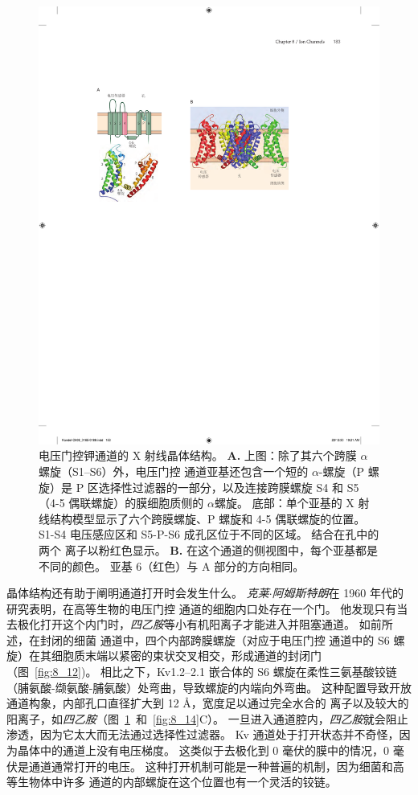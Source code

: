 \begin{figure}[htbp]
	\centering
	\includegraphics[width=0.9\linewidth]{chap08/fig_8_13}
	\caption{电压门控钾通道的 X 射线晶体结构\cite{long2007atomic}。
		\textbf{A.} 上图：除了其六个跨膜 $\alpha$ 螺旋（S1–S6）外，电压门控  通道亚基还包含一个短的 $\alpha$-螺旋（P 螺旋）是 P 区选择性过滤器的一部分，以及连接跨膜螺旋 S4 和 S5（4-5 偶联螺旋）的膜细胞质侧的 $\alpha$螺旋。
		底部：单个亚基的 X 射线结构模型显示了六个跨膜螺旋、P 螺旋和 4-5 偶联螺旋的位置。
		S1-S4 电压感应区和 S5-P-S6 成孔区位于不同的区域。
		结合在孔中的两个  离子以粉红色显示。
		\textbf{B.} 在这个通道的侧视图中，每个亚基都是不同的颜色。
		亚基 6（红色）与 A 部分的方向相同。}
	\label{fig:8_13}
\end{figure}


晶体结构还有助于阐明通道打开时会发生什么。
\textit{克莱$\cdot$阿姆斯特朗}在 1960 年代的研究表明，在高等生物的电压门控  通道的细胞内口处存在一个门。
他发现只有当去极化打开这个内门时，\textit{四乙胺}等小有机阳离子才能进入并阻塞通道。
如前所述，在封闭的细菌  通道中，四个内部跨膜螺旋（对应于电压门控  通道中的 S6 螺旋）在其细胞质末端以紧密的束状交叉相交，形成通道的封闭门（图~\ref{fig:8_12})。
相比之下，Kv1.2–2.1 嵌合体的 S6 螺旋在柔性三氨基酸铰链（脯氨酸-缬氨酸-脯氨酸）处弯曲，导致螺旋的内端向外弯曲。
这种配置导致开放通道构象，内部孔口直径扩大到 12 Å，宽度足以通过完全水合的  离子以及较大的阳离子，如\textit{四乙胺}（图~\ref{fig:8_13}~和~\ref{fig:8_14}C）。
一旦进入通道腔内，\textit{四乙胺}就会阻止  渗透，因为它太大而无法通过选择性过滤器。
Kv 通道处于打开状态并不奇怪，因为晶体中的通道上没有电压梯度。
这类似于去极化到 0 毫伏的膜中的情况，0 毫伏是通道通常打开的电压。
这种打开机制可能是一种普遍的机制，因为细菌和高等生物体中许多  通道的内部螺旋在这个位置也有一个灵活的铰链。


